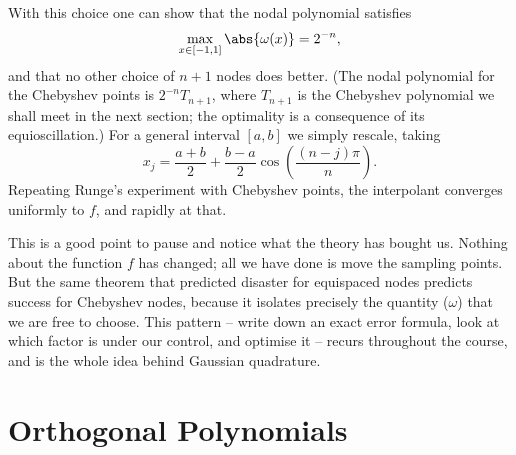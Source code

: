 \begin{center}
\end{center}

With this choice one can show that the nodal polynomial satisfies
$$
\max_{x \in [-1,1]}\abs{\omega(x)} = 2^{-n},
$$
and that no other choice of $n+1$ nodes does better. (The nodal polynomial for the Chebyshev points is $2^{-n}T_{n+1}$, where $T_{n+1}$ is the Chebyshev polynomial we shall meet in the next section; the optimality is a consequence of its equioscillation.) For a general interval $[a,b]$ we simply rescale, taking
$$
x_j = \frac{a+b}{2} + \frac{b-a}{2}\cos\left(\frac{(n-j)\pi}{n}\right).
$$
Repeating Runge's experiment with Chebyshev points, the interpolant converges uniformly to $f$, and rapidly at that.

\begin{remark}
  This is a good point to pause and notice what the theory has bought us. Nothing about the function $f$ has changed; all we have done is move the sampling points. But the same theorem that predicted disaster for equispaced nodes predicts success for Chebyshev nodes, because it isolates precisely the quantity ($\omega$) that we are free to choose. This pattern -- write down an exact error formula, look at which factor is under our control, and optimise it -- recurs throughout the course, and is the whole idea behind Gaussian quadrature.
\end{remark}


\section{Orthogonal Polynomials}


